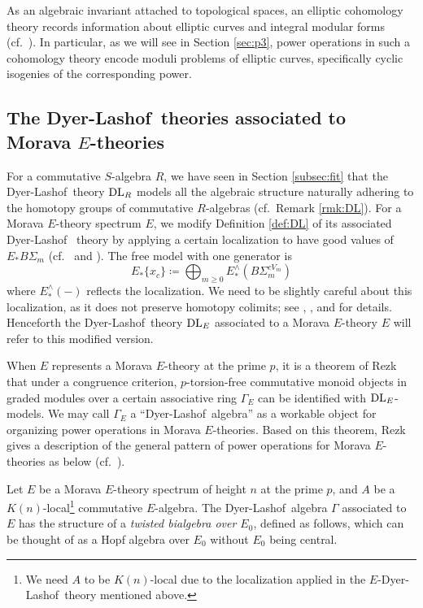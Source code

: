 \documentclass{gtpart}
\theoremstyle{definition}
\theoremstyle{remark}
\newcommand{\dl}{{\rm DL}}
\newcommand{\DL}{Dyer-Lashof~}
\newcommand{\G}{\Gamma}
\newcommand{\ce}{\coloneqq}
\numberwithin{equation}{section}
\numberwithin{thm}{section}
\begin{document}
As an algebraic invariant attached to topological spaces, an elliptic 
cohomology theory records information about elliptic curves and integral 
modular forms (cf.~\cite[Section 2]{tmf3}).  In particular, as we will 
see in Section \ref{sec:p3}, power operations in such a cohomology 
theory encode moduli problems of elliptic curves, specifically cyclic 
isogenies of the corresponding power.  


\subsection{The \DL theories associated to Morava $E$-theories}
\label{subsec:DL_E}

For a commutative $S$-algebra $R$, we have seen in Section 
\ref{subsec:fit} that the \DL theory $\dl_R$ models all the algebraic 
structure naturally adhering to the homotopy groups of commutative 
$R$-algebras (cf.~Remark \ref{rmk:DL}).  For a Morava $E$-theory 
spectrum $E$, we modify Definition \ref{def:DL} of its associated \DL 
theory by applying a certain localization to have good values of 
$E_* B\Sigma_m$ (cf.~\cite[Sections 13-15]{lpo} and 
\cite[Section 3]{cong}).  The free model with one generator is 
\begin{equation}
\label{freeDL_E}
 E_*\{x_c\} \ce \bigoplus_{m \geq 0} E_*^\wedge (B\Sigma_m^{cV_m}) 
\end{equation}
where $E_*^\wedge (-)$ reflects the localization.  We need to be 
slightly careful about this localization, as it does not preserve 
homotopy colimits; see \cite[Sections 2-3]{Str98}, 
\cite[Section 8]{hoveystrickland}, and \cite{hovey08} for details.  
Henceforth the \DL theory $\dl_E$ associated to a Morava $E$-theory $E$ 
will refer to this modified version.  

When $E$ represents a Morava $E$-theory at the prime $p$, it is a 
theorem of Rezk \cite[Theorem A]{cong} that under a congruence criterion, 
$p$-torsion-free commutative monoid objects in graded modules over a 
certain associative ring $\G_E$ can be identified with $\dl_E$-models.  
We may call $\G_E$ a ``\DL algebra'' as a workable object for organizing 
power operations in Morava $E$-theories.  Based on this theorem, Rezk 
gives a description of the general pattern of power operations for 
Morava $E$-theories as below (cf.~\cite{slides,cong}).  

Let $E$ be a Morava $E$-theory spectrum of height $n$ at the prime $p$, 
and $A$ be a $K(n)$-local\footnote{We need $A$ to be $K(n)$-local due to 
the localization applied in the $E$-\DL theory mentioned above.  } 
commutative $E$-algebra.  The \DL algebra $\G$ associated to $E$ has the 
structure of a {\em twisted bialgebra over $E_0$}, defined as follows, 
which can be thought of as a Hopf algebra over $E_0$ without $E_0$ being 
central.  
\end{document}
